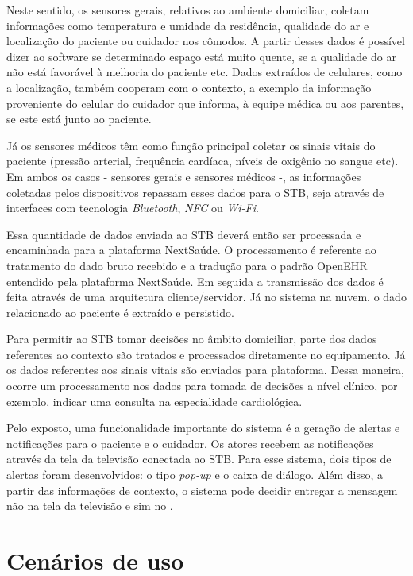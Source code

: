 Neste sentido, os sensores gerais, relativos ao ambiente domiciliar, coletam
informações como  temperatura e umidade da residência, qualidade do ar e
localização do paciente ou cuidador nos cômodos. A partir desses dados é
possível dizer ao software se determinado espaço está muito quente, se a
qualidade do ar não está favorável à melhoria do paciente etc. Dados extraídos
de celulares, como a localização, também cooperam com o contexto, a exemplo da
informação proveniente do celular do cuidador que informa, à equipe médica ou
aos parentes, se este está junto ao paciente.

Já os sensores médicos têm como função principal coletar os sinais vitais do
paciente (pressão arterial, frequência cardíaca, níveis de oxigênio no sangue
etc). Em ambos os casos - sensores gerais e sensores médicos -, as informações
coletadas pelos dispositivos repassam  esses dados para o STB, seja através de
interfaces com tecnologia  \textit{Bluetooth}, \textit{NFC} ou \textit{Wi-Fi}.

Essa quantidade de dados enviada ao STB deverá então ser processada e encaminhada
para a plataforma NextSaúde. O processamento é referente ao tratamento do dado
bruto recebido e a tradução para o padrão OpenEHR entendido pela plataforma
NextSaúde. Em seguida a transmissão dos dados é feita através de uma
arquitetura  cliente/servidor. Já no sistema na nuvem, o dado relacionado ao
paciente é extraído e persistido.

Para permitir ao STB tomar decisões no âmbito domiciliar, parte dos dados
referentes ao contexto são tratados e processados diretamente no equipamento.
Já os dados referentes aos sinais vitais são enviados para plataforma. Dessa 
maneira, ocorre um processamento nos dados para tomada de decisões a nível
clínico, por exemplo, indicar uma consulta na especialidade cardiológica.

Pelo exposto, uma funcionalidade importante do sistema é a geração de alertas e
notificações para o paciente e o cuidador. Os atores recebem as notificações
através da tela da televisão conectada ao STB. Para esse sistema, dois tipos de
alertas foram desenvolvidos: o tipo \textit{pop-up} e o caixa de diálogo.
Além disso, a partir das informações de contexto, o sistema pode decidir
entregar a mensagem não na tela da televisão e sim no \smartphone.


\section{Cenários de uso} \label{sec:cenarios-de-uso}

